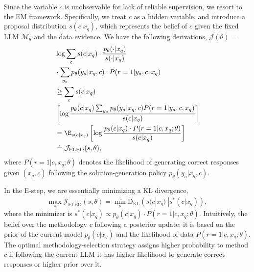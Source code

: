 Since the variable \( c \) is unobservable for lack of reliable supervision, we resort to the EM framework. Specifically,  we treat \( c \) as a hidden variable, and introduce a proposal distribution \(s(c | x_q) \), which represents the belief of \( c \) given the fixed LLM \( \mathcal{M}_\theta \) and the data evidence. We have the following derivations, \( \mathcal{J}(\theta) 
 =\)
\begin{align*}
    &\log \sum_c s(c | x_q)\cdot \frac{p_\theta(\cdot | x_q)}{s(\cdot | x_q)}\\&\cdot
    \sum_{y_a}p_\theta(y_a | x_q,c)\cdot P(r=1 | y_a,c,x_q) 
    \\
    &\ge \sum_c s(c | x_q) \\&\left[ \log  
    \frac{p_\theta(c | x_q)
    \sum_{y_a}p_\theta(y_a | x_q,c) P(r=1 | y_a,c,x_q) 
    }{s(c | x_q)}
    \right]\\
    &=\E_{s(c | x_q)}\left[
    \log \frac{p_\theta(c | x_q)\cdot P(r=1 | c,x_q;\theta)}{s(c | x_q)}
    \right]\\
    &\doteq \mathcal{J}_{\mathrm{ELBO}}(s,\theta),
\end{align*}
where \(P(r=1 | c,x_q;\theta)\) denotes the likelihood of generating correct responses given \((x_q,c)\) following the solution-generation policy \( p_\theta(y_a | x_q,c) \). 

In the E-step, we are essentially minimizing a KL divergence,
\begin{align}
    \max_s \mathcal{J}_{\mathrm{ELBO}}(s,\theta)
    = \min_s \mathrm{D_{KL}}\left(s(c | x_q)\ | s^\ast(c | x_q)\right),
\end{align}
where the minimizer is \(s^\ast(c | x_q) \propto p_\theta(c | x_q)\cdot
P(r=1 | c,x_q;\theta)\). Intuitively, the belief over the methodology \( c \) following a posterior update: it is based on the prior of the current model \( p_\theta(c | x_q) \) and the likelihood of data \( P(r=1 | c,x_q;\theta) \). The optimal methodology-selection strategy assigns higher probability to method \( c \) if following the current LLM it has higher likelihood to generate correct responses or higher prior over it. 


